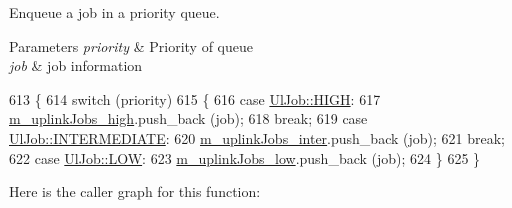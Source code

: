Enqueue a job in a priority queue. 


\begin{DoxyParams}{Parameters}
{\em priority} & Priority of queue \\
\hline
{\em job} & job information \\
\hline
\end{DoxyParams}

\begin{DoxyCode}
613 \{
614   \textcolor{keywordflow}{switch} (priority)
615     \{
616     \textcolor{keywordflow}{case} \hyperlink{classns3_1_1UlJob_a6ae1d8e2e490a32ee1bc8aae661f4983a5094609e73e947663a497fd927ce562e}{UlJob::HIGH}:
617       \hyperlink{classns3_1_1UplinkSchedulerMBQoS_acb8b5539e366b4942381b08edccfba4b}{m\_uplinkJobs\_high}.push\_back (job);
618       \textcolor{keywordflow}{break};
619     \textcolor{keywordflow}{case} \hyperlink{classns3_1_1UlJob_a6ae1d8e2e490a32ee1bc8aae661f4983a3619db7d63201ac367a111b38e443eea}{UlJob::INTERMEDIATE}:
620       \hyperlink{classns3_1_1UplinkSchedulerMBQoS_a70eef7c9cb6dad5e71a2105e07d1ec69}{m\_uplinkJobs\_inter}.push\_back (job);
621       \textcolor{keywordflow}{break};
622     \textcolor{keywordflow}{case} \hyperlink{classns3_1_1UlJob_a6ae1d8e2e490a32ee1bc8aae661f4983a092c552c374d3aecff410695b003d49d}{UlJob::LOW}:
623       \hyperlink{classns3_1_1UplinkSchedulerMBQoS_a73b59113ed20a512685dc76e93cf1faa}{m\_uplinkJobs\_low}.push\_back (job);
624     \}
625 \}
\end{DoxyCode}


Here is the caller graph for this function\+:


